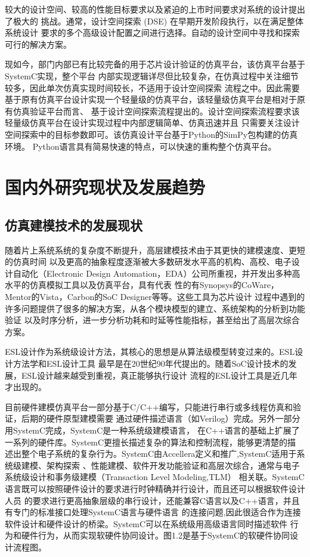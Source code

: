 较大的设计空间、较高的性能目标要求以及紧迫的上市时间要求对系统的设计提出了极大的
挑战。通常，设计空间探索 (DSE)\cite{5} 在早期开发阶段执行，以在满足整体系统设计
要求的多个高级设计配置之间进行选择。自动的设计空间中寻找和探索可行的解决方案。

现如今，部门内部已有比较完备的用于芯片设计验证的仿真平台，该仿真平台基于SystemC实现，整个平台
内部实现逻辑详尽但比较复杂，在仿真过程中关注细节较多，因此单次仿真实现时间较长，不适用于设计空间探索
流程之中。因此需要基于原有仿真平台设计实现一个轻量级的仿真平台，该轻量级仿真平台是相对于原有仿真验证平台而言、
基于设计空间探索流程提出的。设计空间探索流程要求该轻量级仿真平台在设计实现过程中内部逻辑简单、仿真迅速并且
只需要关注设计空间探索中的目标参数即可。该仿真设计平台基于Python的SimPy\cite{6}包构建的仿真环境。
Python语言具有简易快速的特点，可以快速的重构整个仿真平台。

\section{国内外研究现状及发展趋势}

\subsection{仿真建模技术的发展现状}
随着片上系统系统的复杂度不断提升，高层建模技术由于其更快的建模速度、更短的仿真时间
以及更高的抽象程度逐渐被大多数研发水平高的机构、高校、电子设计自动化（Electronic Design 
Automation，EDA）公司所重视，并开发出多种高水平的仿真模拟工具以及仿真平台，具有代表
性的有Synopsys的CoWare，Mentor的Vista，Carbon的SoC Designer等等。这些工具为芯片设计
过程中遇到的许多问题提供了很多的解决方案，从各个模块模型的建立、系统架构的分析到功能验证
以及时序分析，进一步分析功耗和时延等性能指标\cite{38}，甚至给出了高层次综合方案。

ESL设计作为系统级设计方法，其核心的思想是从算法级模型转变过来的。ESL设计方法学和ESL设计工具
最早是在20世纪90年代提出的。随着SoC设计技术的发展，ESL设计越来越受到重视，真正能够执行设计
流程的ESL设计工具是近几年才出现的。

目前硬件建模仿真平台一部分基于C/C++编写，只能进行串行或多线程仿真和验证，后期的硬件原型建模需要
通过硬件描述语言（如Verilog）完成。另外一部分用SystemC完成，SystemC\cite{7}是一种系统级建模语言，
在C++语言的基础上扩展了一系列的硬件库。SystemC更擅长描述复杂的算法和控制流程，能够更清楚的描
述出整个电子系统的复杂行为。SystemC由Accellera定义和推广,SystemC适用于系统级建模、架构探索
、性能建模、软件开发功能验证和高层次综合，通常与电子系统级设计和事务级建模（Transaction Level Modeling,TLM）
相关联。SystemC语言既可以按照硬件设计的要求进行时钟精确并行设计，而且还可以根据软件设计人员
的要求进行更高抽象层级的串行设计，还能兼容C语言以及C++语言，并且有专门的标准接口处理SystemC语言与硬件语言
的连接问题,因此很适合作为连接软件设计和硬件设计的桥梁\cite{37}。SystemC可以在系统级用高级语言同时描述软件
行为和硬件行为，从而实现软硬件协同设计\cite{40}。图1.2是基于SystemC的软硬件协同设计流程图。


